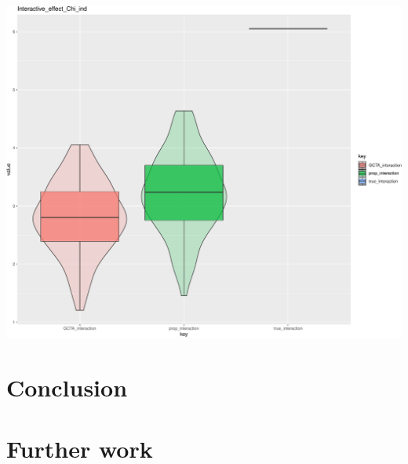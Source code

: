 \documentclass[]{article}
\begin{document}
\includegraphics{Norl_cor_simulation_files/figure-latex/chi_inter-1.pdf}

\section{Conclusion}\label{conclusion}

\section{Further work}\label{further-work}
\end{document}
